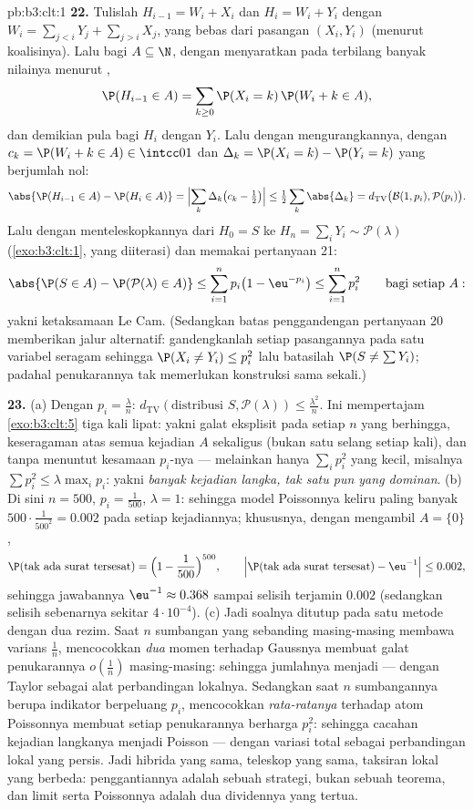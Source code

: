 \begin{solution}{pb:b3:clt:1}
\textbf{22.} Tulislah $H_{i-1} = W_i + X_i$ dan $H_i = W_i +
Y_i$ dengan $W_i = \sum_{j<i}Y_j + \sum_{j>i}X_j$, yang
bebas dari pasangan $(X_i, Y_i)$ (menurut koalisinya). Lalu bagi $A
\subseteq \N$, dengan menyaratkan pada terbilang banyak nilainya
menurut ,
\[
\P(H_{i-1} \in A) = \sum_{k\geq0}\P(X_i = k)\,\P(W_i + k
\in A),
\]
dan demikian pula bagi $H_i$ dengan $Y_i$. Lalu dengan mengurangkannya, dengan $c_k
= \P(W_i + k \in A) \in \intcc01$ dan $\Delta_k = \P(X_i =
k) - \P(Y_i = k)$ yang berjumlah nol:
\[
\abs{\P(H_{i-1} \in A) - \P(H_i \in A)} =
\Bigl|\sum_k\Delta_k\bigl(c_k - \tfrac12\bigr)\Bigr| \leq
\tfrac12\sum_k\abs{\Delta_k} =
d_{\mathrm{TV}}\bigl(\mathcal B(1, p_i), \mathcal
P(p_i)\bigr) .
\]
Lalu dengan menteleskopkannya dari $H_0 = S$ ke $H_n = \sum_iY_i \sim
\mathcal P(\lambda)$ (\cref{exo:b3:clt:1}, yang diiterasi) dan
memakai pertanyaan 21:
\[
\abs{\P(S \in A) - \P(\mathcal P(\lambda) \in A)} \leq
\sum_{i=1}^np_i\bigl(1 - \eu^{-p_i}\bigr) \leq
\sum_{i=1}^np_i^2
\qquad\text{bagi setiap } A :
\]
yakni ketaksamaan Le Cam. (Sedangkan batas penggandengan pertanyaan 20 memberikan
jalur alternatif: gandengkanlah setiap pasangannya pada satu variabel
seragam sehingga $\P(X_i \neq Y_i) \leq p_i^2$ lalu batasilah
$\P(S \neq \sum Y_i)$; padahal penukarannya tak memerlukan konstruksi
sama sekali.)

\textbf{23.} (a) Dengan $p_i = \frac\lambda n$:
$d_{\mathrm{TV}}(\text{distribusi }S, \mathcal P(\lambda))
\leq \frac{\lambda^2}n$. Ini mempertajam
\cref{exo:b3:clt:5} tiga kali lipat: yakni galat eksplisit pada
setiap $n$ yang berhingga, keseragaman atas semua kejadian $A$ sekaligus
(bukan satu selang setiap kali), dan tanpa menuntut kesamaan
$p_i$-nya --- melainkan hanya $\sum_ip_i^2$ yang kecil, misalnya $\sum p_i^2 \leq
\lambda\max_ip_i$: yakni \emph{banyak kejadian langka, tak satu pun
yang dominan}. (b) Di sini $n = 500$, $p_i = \frac1{500}$,
$\lambda = 1$: sehingga model Poissonnya keliru paling banyak
$500\cdot\frac1{500^2} = 0.002$ pada setiap kejadiannya; khususnya,
dengan mengambil $A = \{0\}$,
\[
\P(\text{tak ada surat tersesat}) = \Bigl(1 -
\frac1{500}\Bigr)^{500},
\qquad
\Bigl|\P(\text{tak ada surat tersesat}) - \eu^{-1}\Bigr| \leq
0.002,
\]
sehingga jawabannya $\eu^{-1} \approx 0.368$ sampai selisih
terjamin $0.002$ (sedangkan selisih sebenarnya sekitar
$4\cdot10^{-4}$). (c) Jadi
soalnya ditutup pada satu metode dengan dua rezim. Saat $n$
sumbangan yang sebanding masing-masing membawa varians
$\frac1n$, mencocokkan \emph{dua} momen terhadap
Gaussnya membuat galat penukarannya $o(\frac1n)$ masing-masing: sehingga jumlahnya
menjadi  --- dengan Taylor sebagai alat perbandingan lokalnya.
Sedangkan saat $n$ sumbangannya berupa indikator berpeluang
$p_i$, mencocokkan \emph{rata-ratanya} terhadap atom Poissonnya
membuat setiap penukarannya berharga $p_i^2$: sehingga cacahan kejadian langkanya menjadi
Poisson --- dengan variasi total sebagai perbandingan lokal
yang persis. Jadi hibrida yang sama, teleskop yang sama, taksiran lokal
yang berbeda: penggantiannya adalah sebuah strategi, bukan sebuah teorema, dan
limit  serta Poissonnya adalah dua dividennya yang
tertua.


\end{solution}
